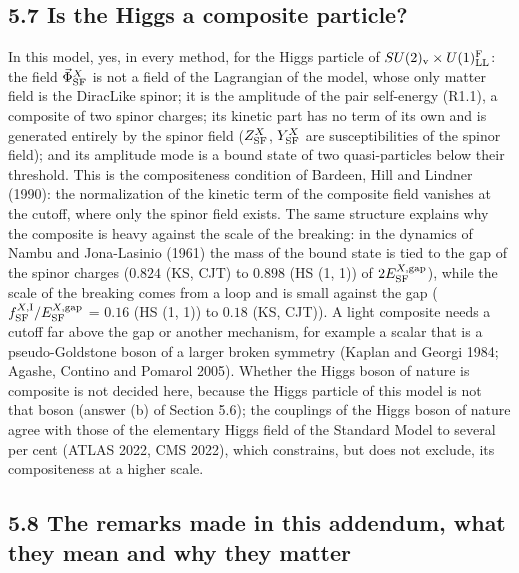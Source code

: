 \documentclass[
  10pt,
]{article}
\begin{document}
\hypertarget{is-the-higgs-a-composite-particle}{%
\subsection{5.7 Is the Higgs a composite
particle?}\label{is-the-higgs-a-composite-particle}}

In this model, yes, in every method, for the Higgs particle of
\(SU(2)_{\rm v}\times U(1)^{\rm F}_{\rm LL}\): the field
\(\vec\Phi^X_{\rm SF}\) is not a field of the Lagrangian of the model,
whose only matter field is the DiracLike spinor; it is the amplitude of
the pair self-energy (R1.1), a composite of two spinor charges; its
kinetic part has no term of its own and is generated entirely by the
spinor field (\(Z^X_{\rm SF}\), \(Y^X_{\rm SF}\) are susceptibilities of
the spinor field); and its amplitude mode is a bound state of two
quasi-particles below their threshold. This is the compositeness
condition of Bardeen, Hill and Lindner (1990): the normalization of the
kinetic term of the composite field vanishes at the cutoff, where only
the spinor field exists. The same structure explains why the composite
is heavy against the scale of the breaking: in the dynamics of Nambu and
Jona-Lasinio (1961) the mass of the bound state is tied to the gap of
the spinor charges (\(0.824\) (KS, CJT) to \(0.898\) (HS (1, 1)) of
\(2E^{X,{\rm gap}}_{\rm SF}\)), while the scale of the breaking comes
from a loop and is small against the gap
(\(f^{X,{\rm I}}_{\rm SF}/E^{X,{\rm gap}}_{\rm SF}\) = \(0.16\) (HS (1,
1)) to \(0.18\) (KS, CJT)). A light composite needs a cutoff far above
the gap or another mechanism, for example a scalar that is a
pseudo-Goldstone boson of a larger broken symmetry (Kaplan and Georgi
1984; Agashe, Contino and Pomarol 2005). Whether the Higgs boson of
nature is composite is not decided here, because the Higgs particle of
this model is not that boson (answer (b) of Section 5.6); the couplings
of the Higgs boson of nature agree with those of the elementary Higgs
field of the Standard Model to several per cent (ATLAS 2022, CMS 2022),
which constrains, but does not exclude, its compositeness at a higher
scale.

\hypertarget{the-remarks-made-in-this-addendum-what-they-mean-and-why-they-matter}{%
\subsection{5.8 The remarks made in this addendum, what they mean and
why they
matter}\label{the-remarks-made-in-this-addendum-what-they-mean-and-why-they-matter}}
\end{document}
